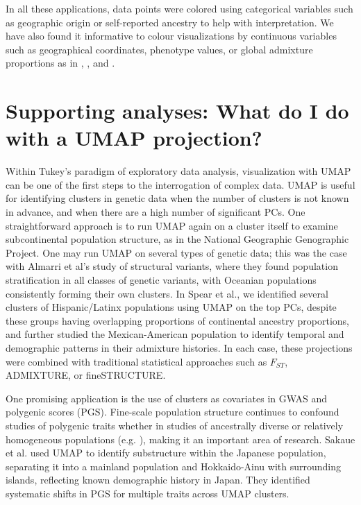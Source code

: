 In all these applications, data points were colored using categorical variables such as geographic origin or self-reported ancestry to help with interpretation. We have also found it informative to colour visualizations by continuous variables such as geographical coordinates, phenotype values, or global admixture proportions as in \citep{diaz-papkovich_umap_2019}, \citep{dai_population_2020}, and \citep{spear2020recent}.

\section{Supporting analyses: What do I do with a UMAP projection?}
Within Tukey's paradigm of exploratory data analysis, visualization with UMAP can be one of the first steps to the interrogation of complex data\citep{holmes_modern_2019}. UMAP is useful for identifying clusters in genetic data when the number of clusters is not known in advance\citep{tonkin-hill_fast_2019}, and when there are a high number of significant PCs\citep{diaz-papkovich_umap_2019}. One straightforward approach is to run UMAP again on a cluster itself to examine subcontinental population structure, as in the National Geographic Genographic Project\citep{dai_population_2020}. One may run UMAP on several types of genetic data; this was the case with Almarri et al's study of structural variants, where they found population stratification in all classes of genetic variants, with Oceanian populations consistently forming their own clusters\citep{almarri2020population}. In Spear et al., we identified several clusters of Hispanic/Latinx populations using UMAP on the top PCs, despite these groups having overlapping proportions of continental ancestry proportions, and further studied the Mexican-American population to identify temporal and demographic patterns in their admixture histories\citep{spear2020recent}. In each case, these projections were combined with traditional statistical approaches such as $F_{ST}$, ADMIXTURE\citep{alexander2009fast}, or fineSTRUCTURE\citep{lawson2012inference}.

One promising application is the use of clusters as covariates in GWAS and polygenic scores (PGS). Fine-scale population structure continues to confound studies of polygenic traits whether in studies of ancestrally diverse or relatively homogeneous populations (e.g. \citep{kerminen_geographic_2019,berg_reduced_2019,sohail2019polygenic}), making it an important area of research. Sakaue et al. used UMAP to identify substructure within the Japanese population, separating it into a mainland population and Hokkaido-Ainu with surrounding islands, reflecting known demographic history in Japan\citep{sakaue_dimensionality_2020}. They identified systematic shifts in PGS for multiple traits across UMAP clusters.

